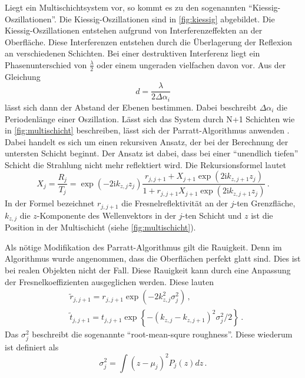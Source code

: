 Liegt ein Multischichtsystem vor, so kommt es zu den sogenannten \enquote{Kiessig-Oszillationen}.
Die Kiessig-Oszillationen sind in \autoref{fig:kiessig} abgebildet.
Die Kiessig-Oszillationen entstehen aufgrund von Interferenzeffekten an der Oberfläche.
Diese Interferenzen entstehen durch die Überlagerung der Reflexion an verschiedenen Schichten.
Bei einer destruktiven Interferenz liegt ein Phasenunterschied von $\frac{\lambda}{2}$ oder einem ungeraden vielfachen davon vor.
Aus der Gleichung
\begin{equation} \label{eq:schichtdicke}
    d = \frac{\lambda}{2 \Delta \alpha_i}
\end{equation}
lässt sich dann der Abstand der Ebenen bestimmen.
Dabei beschreibt $\Delta \alpha_i$ die Periodenlänge einer Oszillation. 
Lässt sich das System durch N+1 Schichten wie in \autoref{fig:multischicht} beschreiben, lässt sich der Parratt-Algorithmus anwenden \cite{tolan_xray}.
Dabei handelt es sich um einen rekursiven Ansatz, der bei der Berechnung der untersten Schicht beginnt.
Der Ansatz ist dabei, dass bei einer \enquote{unendlich tiefen} Schicht die Strahlung nicht mehr reflektiert wird.
Die Rekursionsformel lautet
\begin{equation}
    X_j=\frac{R_j}{T_j}=\exp \left(-2 \mathrm{i} k_{z, j} z_j\right) \frac{r_{j, j+1}+X_{j+1} \exp \left(2 \mathrm{i} k_{z, j+1} z_j\right)}{1+r_{j, j+1} X_{j+1} \exp \left(2 \mathrm{i} k_{z, j+1} z_j\right)} \, .
\end{equation}
In der Formel bezeichnet $r_{j,j+1}$ die Fresnelreflektivität an der $j$-ten Grenzfläche, $k_{z, j}$ die $z$-Komponente des Wellenvektors in der $j$-ten Schicht
und $z$ ist die Position in der Multischicht (siehe \autoref{fig:multischicht}).

Als nötige Modifikation des Parratt-Algorithmus gilt die Rauigkeit.
Denn im Algorithmus wurde angenommen, dass die Oberflächen perfekt glatt sind.
Dies ist bei realen Objekten nicht der Fall.
Diese Rauigkeit kann durch eine Anpassung der Fresnelkoeffizienten ausgeglichen werden.
Diese lauten
\begin{align}
    & \tilde{r}_{j, j+1}=r_{j, j+1} \exp \left(-2 k_{z, j}^2 \sigma_j^2\right) \, ,\\
    & \tilde{t}_{j, j+1}=t_{j, j+1} \exp \left\{-\left(k_{z, j}-k_{z, j+1}\right)^2 \sigma_j^2 / 2\right\} \, .
\end{align}
Das $\sigma_j^2$ beschreibt die sogenannte \enquote{root-mean-squre roughness}.
Diese wiederum ist definiert als
\begin{equation*}
    \sigma_j^2 = \int (z - \mu_j)^2 P_j (z) dz \, .
\end{equation*}

